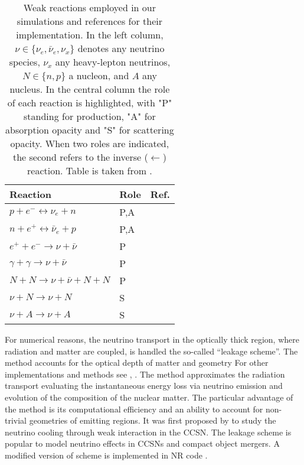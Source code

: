 \begin{table}
    \caption{
        Weak reactions employed in our simulations and references for their implementation.
        In the left column, $\nu \in \{\nu_e, \bar{\nu}_e, \nu_{x}\}$ denotes any neutrino species, 
        $\nu_{x}$ any heavy-lepton neutrinos, $N \in\{n, p\}$ a nucleon, and $A$ any nucleus.
        In the central column the role of each reaction is highlighted, with "P" standing for 
        production, "A" for absorption opacity and "S" for scattering opacity. When two roles are
        indicated, the second refers to the inverse ($\leftarrow$) reaction.
        Table is taken from \cite{Radice:2018pdn}.
    }
    \label{tab:leakage}
    \begin{center}
        \begin{tabular}{lll}
            \hline\hline
            Reaction & Role &  Ref. \\ 
            \hline
            $p + e^- \leftrightarrow \nu_e + n $          & P,A & \cite{Bruenn:1985}  \\
            $n + e^+ \leftrightarrow \bar{\nu}_{e} + p $  & P,A & \cite{Bruenn:1985}  \\
            $e^+ + e^- \rightarrow \nu + \bar{\nu}$       & P & \cite{Ruffert:1995fs} \\
            $\gamma + \gamma \rightarrow \nu + \bar{\nu}$ & P & \cite{Ruffert:1995fs} \\
            $N + N \rightarrow \nu + \bar{\nu} + N  + N$  & P & \cite{Burrows:2004vq} \\
            $\nu + N \rightarrow \nu + N$                 & S & \cite{Ruffert:1995fs} \\
            $\nu + A \rightarrow \nu + A$                 & S & \cite{Shapiro:1983du} \\
            \hline\hline
        \end{tabular}
    \end{center}
\end{table}


For numerical reasons, the neutrino transport in the optically thick region, 
where radiation and matter are coupled, is handled the so-called ``leakage scheme''. 
The method accounts for the optical depth of matter and geometry 
\citep{Ruffert:1995fs,Rosswog:2003rv,Sekiguchi:2010zz,OConnor:2009iuz,Galeazzi:2013mia}
%
For other implementations and methods see \eg, 
\citet{vanRiper:1981mko,Ruffert:1995fs,Rosswog:2003rv,OConnor:2009iuz,Sekiguchi:2010ep,
    Neilsen:2014hha,Perego:2015agy,Ardevol-Pulpillo:2018btx}.
%
The method approximates the radiation transport evaluating the instantaneous energy loss 
via neutrino emission and evolution of the composition of the nuclear matter.
The particular advantage of the method is its computational efficiency and an ability 
to account for non-trivial geometries of emitting regions.
%
It was first proposed by \citet{vanRiper:1981mko} to study the neutrino cooling through weak interaction 
in the \ac{CCSN}. The leakage scheme is popular to model neutrino effects in \acp{CCSN} 
and compact object mergers.
%
A modified version of \cite{Galeazzi:2013mia} scheme is implemented in 
\ac{NR} code \wisky{} \citep{Radice:2016dwd,Radice:2018pdn}.

